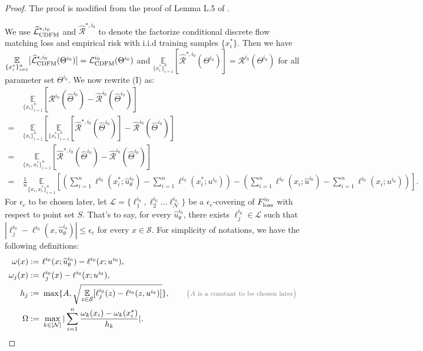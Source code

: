 \documentclass[12pt]{article}
\numberwithin{equation}{section}
\let\hat\widehat
\newcommand{\wh}{\widehat}
\renewcommand{\hat}{\wh}
\DeclareMathOperator*{\E}{{\mathbb{E}}}
\def\E{\mathbb{E}}
\let\cite\citep
\theoremstyle{theoremstyle}
\numberwithin{equation}{section}
\numberwithin{theorem}{section}
\numberwithin{proposition}{section}
\numberwithin{definition}{section}
\numberwithin{lemma}{section}
\numberwithin{assumption}{section}
\numberwithin{remark}{section}
\newcommand*{\annot}[1]{\tag*{\footnotesize{\textcolor{black!50}{\big(#1\big)}}}}
\begin{document}
\begin{proof}
The proof is modified from the proof of Lemma L.5 of \cite{su2025high}.

We use $\hat{\mathcal{L}}^{*,i_0}_{\rm CDFM}$ and $\hat{\mathcal{R}}^{*,i_0}$ to denote the factorize conditional discrete flow matching loss and empirical risk with i.i.d training samples $\{x_i^*\}$.
Then we have $\underset{\{x_i^*\}_{i=1}^n}{\E}[\hat{\mathcal{L}}^{*,i_0}_{\rm CDFM}(\Theta^{i_0})] = \mathcal{L}^{i_0}_{\rm CDFM}(\Theta^{i_0})$ and $\underset{\{x_i^*\}_{i=1}^n}{\E}[\hat{\mathcal{R}}^{*,i_0}(\Theta^{i_0})]=\mathcal{R}^{i_0}(\Theta^{i_0})$ for all parameter set $\Theta^{i_0}$.
We now rewrite (I) as:
\begin{align*}
    & ~\underset{\{x_i\}_{i=1}^n}{\E}[\mathcal{R}^{i_0}(\hat{\Theta}^{i_0})-\hat{\mathcal{R}}^{i_0}(\hat{\Theta}^{i_0})] \\
    = & ~
    \underset{\{x_i\}_{i=1}^n}{\E}[\underset{\{x_i^*\}_{i=1}^n}{\E}[\hat{\mathcal{R}}^{*,i_0}(\hat{\Theta}^{i_0})]-\hat{\mathcal{R}}^{i_0}(\hat{\Theta}^{i_0})] \\
    = & ~
    \underset{\{x_i,x_i^*\}_{i=1}^n}{\E}[\hat{\mathcal{R}}^{*,i_0}(\hat{\Theta}^{i_0})-\hat{\mathcal{R}}^{i_0}(\hat{\Theta}^{i_0})] \\
    = & ~
    \frac{1}{n}\underset{\{x_i,x_i^*\}_{i=1}^n}{\E}[(\sum_{i=1}^n\ell^{i_0}(x_i^*;\hat{u}^{i_0}_\theta)-\sum_{i=1}^n\ell^{i_0}(x_i^*;u^{i_0}))-(\sum_{i=1}^n\ell^{i_0}(x_i;\hat{u}^{i_0})-\sum_{i=1}^n\ell^{i_0}(x_i;u^{i_0}))].
\end{align*}
For $\epsilon_c$ to be chosen later, let $\mathcal{L}=\{\ell^{i_0}_1,\ell^{i_0}_2...\ell^{i_0}_\mathcal{N}\}$ be a $\epsilon_c$-covering of $F^{i_0}_{\rm loss}$ with respect to point set $S$.
That's to say, for every $\hat{u}^{i_0}_\theta$, there exists $\ell^{i_0}_j\in \mathcal{L}$ such that $|\ell^{i_0}_j-\ell^{i_0}(x,\hat{u}^{i_0}_\theta)|\leq\epsilon_c$ for every $x\in \mathcal{S}$.
For simplicity of notations, we have the following definitions:
\begin{align*}
    \omega(x) := & ~
    \ell^{i_0}(x;\hat{u}^{i_0}_\theta)-\ell^{i_0}(x;u^{i_0}), \\
    \omega_j(x) := & ~
    \ell^{i_0}_j(x)-\ell^{i_0}(x;u^{i_0}), \\
    h_j:= & ~
    \max\{A, \sqrt{\underset{z\in \mathcal{S}}{\E}[\ell^{i_0}_j(z)-\ell^{i_0}(z,u^{i_0})]}\}, \annot{$A$ is a constant to be chosen later}\\
    \Omega:= & ~
    \max_{k\in[\mathcal{N}]}|\sum_{i=1}^n\frac{\omega_k(x_i)-\omega_k(x_i^*)}{h_k}|.

\end{align*}
\end{proof}
\end{document}
